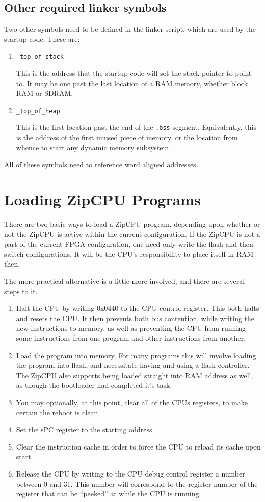 \documentclass{gqtekspec}
\begin{document}
\subsection{Other required linker symbols}\label{sec:ld-other}

Two other symbols need to be defined in the linker script, which are used
by the startup code.  These are:
\begin{enumerate}
\item {\tt \_top\_of\_stack}

	This is the address that the startup code will set the stack pointer
	to point to.  It may be one past the last location of a RAM memory,
	whether block RAM or SDRAM.

\item {\tt \_top\_of\_heap}

	This is the first location past the end of the {\tt .bss} segment.
	Equivalently, this is the address of the first unused piece of
	memory, or the location from whence to start any dynamic memory
	subsystem.
\end{enumerate}

All of these symbols need to reference word aligned addresses.

\section{Loading ZipCPU Programs}
There are two basic ways to load a ZipCPU program, depending upon whether or
not the ZipCPU is active within the current configuration.  If the ZipCPU
is not a part of the current FPGA configuration, one need only write the 
flash and then switch configurations.  It will be the CPU's responsibility
to place itself in RAM then. 

The more practical alternative is a little more involved, and there are
several steps to it.
\begin{enumerate}
\item Halt the CPU by writing 0x0440 to the CPU control register.  This
	both halts and resets the CPU.  It then prevents both bus contention,
	while writing the new instructions to memory, as well as preventing the
	CPU from running some instructions from one program and other
	instructions from another.
\item Load the program into memory.  For many programs this will involve
	loading the program into flash, and necessitate having and using a 
	flash controller.  The ZipCPU also supports being loaded straight into
	RAM address as well, as though the bootloader had completed
	it's task.
\item You may optionally, at this point, clear all of the CPUs registers,
	to make certain the reboot is clean.
\item Set the sPC register to the starting address. 
\item Clear the instruction cache in order to force the CPU to reload its
	cache upon start.
\item Release the CPU by writing to the CPU debug control register a number
	between 0 and 31.  This number will correspond to the register number
	of the register that can be ``peeked'' at while the CPU is running.
\end{enumerate}
\end{document}
